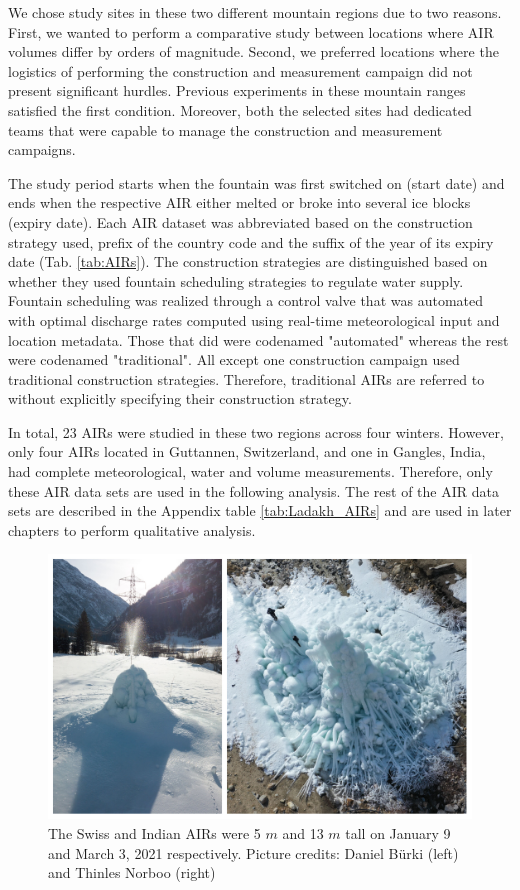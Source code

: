 We chose study sites in these two different mountain regions due to two reasons. First, we wanted to perform a
comparative study between locations where AIR volumes differ by orders of magnitude. Second, we preferred
locations where the logistics of performing the construction and measurement campaign did not present
significant hurdles. Previous experiments in these mountain ranges satisfied the first condition. Moreover, both
the selected sites had dedicated teams that were capable to manage the construction and measurement campaigns.

The study period starts when the fountain was first switched on (start date) and ends when the respective AIR
either melted or broke into several ice blocks (expiry date).  Each AIR dataset was abbreviated based on the
construction strategy used, prefix of the country code and the suffix of the year of its expiry date
(Tab. \ref{tab:AIRs}). The construction strategies are distinguished based on whether they used fountain scheduling
strategies to regulate water supply. Fountain scheduling was realized through a control valve that was automated
with optimal discharge rates computed using real-time meteorological input and location metadata. Those that did were
codenamed "automated" whereas the rest were codenamed "traditional". All except one construction campaign used
traditional construction strategies. Therefore, traditional \ac{AIRs} are referred to without explicitly
specifying their construction strategy.

In total, 23 \ac{AIRs} were studied in these two regions across four winters.  However, only four \ac{AIRs} located in
Guttannen, Switzerland, and one in Gangles, India, had complete meteorological, water and volume measurements. Therefore,
only these AIR data sets are used in the following analysis. The rest of the AIR data sets are described in the
Appendix table \ref{tab:Ladakh_AIRs} and are used in later chapters to perform qualitative analysis.

\begin{figure}[htb]
	\centering
	\includegraphics[width=12 cm]{figs/2AIRs.jpg}
	\caption{The Swiss and Indian \ac{AIRs} were 5 $m$ and 13 $m$ tall on January 9 and March 3, 2021 respectively. Picture
		credits: Daniel Bürki (left) and Thinles Norboo (right)}
	\label{fig:2AIRs}
\end{figure}

